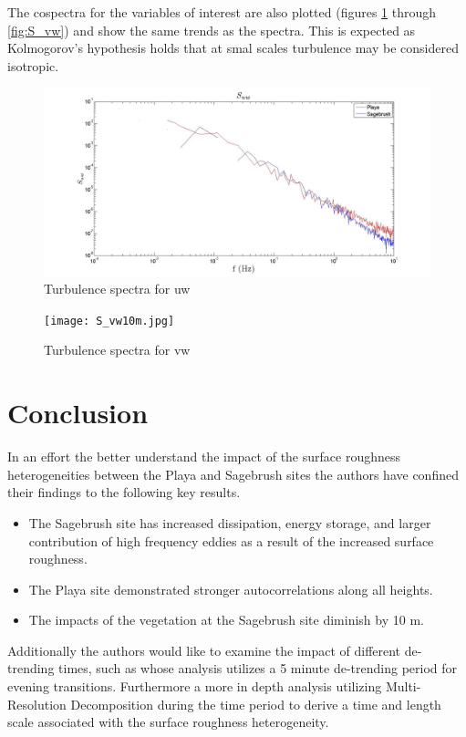 \documentclass[]{article}
\begin{document}
The cospectra for the variables of interest are also plotted (figures \ref{fig:S_uw10m} through \ref{fig:S_vw}) and show the same trends as the spectra. This is expected as Kolmogorov's hypothesis holds that at smal scales turbulence may be considered isotropic.\cite{Pope}
\begin{figure}[h]
	\centering
	\includegraphics[width=\textwidth]{S_uw10m.jpg}
	\caption{Turbulence spectra for uw}
	\label{fig:S_uw10m}
\end{figure}
\begin{figure}[h]
	\centering
	\texttt{[image: S\_vw10m.jpg]}
	\caption{Turbulence spectra for vw}
	\label{fig:S_vw10m}
\end{figure}

\section{Conclusion}
 In an effort the better understand the impact of the surface roughness heterogeneities between the Playa and Sagebrush sites the authors have confined their findings to the following key results. 
 \begin{itemize}
 	\item
 	The Sagebrush site has increased dissipation, energy storage, and larger contribution of high frequency eddies as a result of the increased surface roughness.
 	\item
 	The Playa site demonstrated stronger autocorrelations along all heights.
 	\item 
 	The impacts of the vegetation at the Sagebrush site diminish by 10 m.
 \end{itemize}
 
 
 Additionally the authors would like to examine the impact of different de-trending times, such as \cite{} whose analysis utilizes a 5 minute de-trending period for evening transitions. Furthermore a more in depth analysis utilizing Multi-Resolution Decomposition during the time period  to derive a time and length scale associated with the surface roughness heterogeneity. 

\newpage


\end{document}
